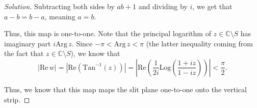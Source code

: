 \documentclass[11pt]{article}
\newcommand{\C}{\mathbb{C}}
\newenvironment{solution}
  {\renewcommand\qedsymbol{$\blacksquare$}\begin{proof}[Solution]}
  {\end{proof}}
\theoremstyle{definition}
\begin{document}
\begin{enumerate}[a)]
\begin{solution}
Subtracting both sides by $ab+1$ and dividing by $i$, we get that $a-b = b-a$, meaning $a = b$.

Thus, this map is one-to-one. Note that the principal logarithm of $z \in \C \setminus S$ has imaginary part $i \mathrm{Arg} \, z.$ Since $-\pi < \mathrm{Arg} \, z < \pi$ (the latter inequality coming from the fact that $z \in \C \setminus S$), we know that 
\[ |\mathrm{Re} \, w| = |\mathrm{Re}(\mathrm{Tan}^{-1}(z))| = \left|\mathrm{Re}\left(\frac{1}{2i} \mathrm{Log} \left( \frac{1+iz}{1-iz} \right)\right)\right| < \frac{\pi}{2}. \]

Thus, we know that this map maps the slit plane one-to-one onto the vertical strip. 
\end{solution}


\end{enumerate}
\end{document}
